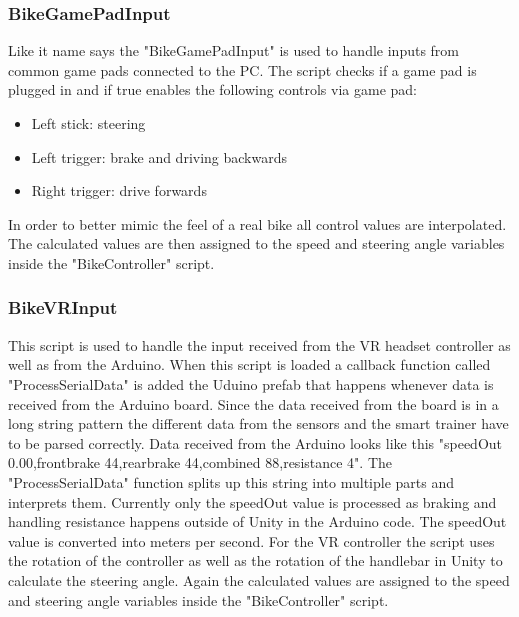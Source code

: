 \documentclass[english,notitlepage,smartquotes]{hgbreport}
\begin{document}
\subsubsection{BikeGamePadInput}
Like it name says the "BikeGamePadInput" is used to handle inputs from common game pads connected to the PC. The script checks if a game pad is plugged in and if true enables the following controls via game pad:
\begin{itemize}
	\item Left stick: steering
	\item Left trigger: brake and driving backwards
	\item Right trigger: drive forwards
\end{itemize}
In order to better mimic the feel of a real bike all control values are interpolated. The calculated values are then assigned to the speed and steering angle variables inside the "BikeController" script.
\subsubsection{BikeVRInput}
This script is used to handle the input received from the VR headset controller as well as from the Arduino. 
When this script is loaded a callback function called "ProcessSerialData" is added the Uduino prefab that happens whenever data is received from the Arduino board.
Since the data received from the board is in a long string pattern the different data from the sensors and the smart trainer have to be parsed correctly.
Data received from the Arduino looks like this "speedOut 0.00,frontbrake 44,rearbrake 44,combined 88,resistance 4". The  "ProcessSerialData" function splits up this string into multiple parts and interprets them. 
Currently only the speedOut value is processed as braking and handling resistance happens outside of Unity in the Arduino code. The speedOut value is converted into meters per second.
For the VR controller the script uses the rotation of the controller as well as the rotation of the handlebar in Unity to calculate the steering angle.
Again the calculated values are assigned to the speed and steering angle variables inside the "BikeController" script.
\end{document}

